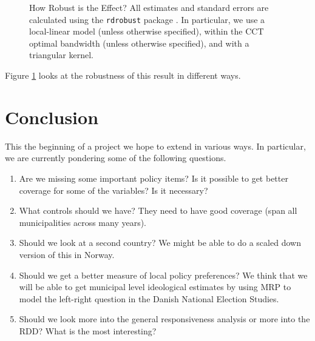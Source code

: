 \documentclass[a4paper,12pt]{article}
\newcommand{\beginsupplement}{%
	\setcounter{table}{0}
	\renewcommand{\thetable}{S.\arabic{table}}%
	\setcounter{figure}{0}
	\renewcommand{\thefigure}{S.\arabic{figure}}%
}
\begin{document}
\begin{figure}[htbp]
	\caption{How Robust is the Effect?  All estimates and standard errors are calculated using the \texttt{rdrobust} package \cite{calonico2015rdrobust}. In particular, we use a local-linear model (unless otherwise specified), within the CCT optimal bandwidth (unless otherwise specified), and with a triangular kernel. }
	\label{fig:rdrobust}
\end{figure}

Figure 	\ref{fig:rdrobust} looks at the robustness of this result in different ways.


\newpage
	
\section{Conclusion}
This the beginning of a project we hope to extend in various ways. In particular, we are currently pondering some of the following questions.
\begin{enumerate}
	\item Are we missing some important policy items? Is it possible to get better coverage for some of the variables? Is it necessary?
	\item  What controls should we have? They need to have good coverage (span all municipalities across many years).
	\item Should we look at a second country? We might be able to do a scaled down version of this in Norway. 
	\item Should we get a better measure of local policy preferences? We think that we will be able to get municipal level ideological estimates by using MRP to model the left-right question in the Danish National Election Studies.
	\item Should we look more into the general responsiveness analysis or more into the RDD? What is the most interesting?
\end{enumerate}








	
\end{document}
